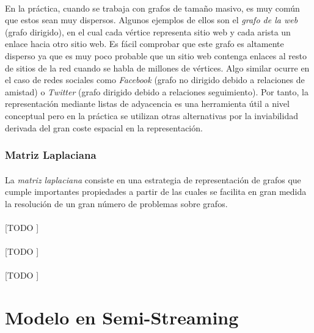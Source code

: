 \documentclass{subfiles}
\begin{document}
        \paragraph{}
        En la práctica, cuando se trabaja con grafos de tamaño masivo, es muy común que estos sean muy dispersos. Algunos ejemplos de ellos son el \emph{grafo de la web} (grafo dirigido), en el cual cada vértice representa sitio web y cada arista un enlace hacia otro sitio web. Es fácil comprobar que este grafo es altamente disperso ya que es muy poco probable que un sitio web contenga enlaces al resto de sitios de la red cuando se habla de millones de vértices. Algo similar ocurre en el caso de redes sociales como \emph{Facebook} (grafo no dirigido debido a relaciones de amistad) o \emph{Twitter} (grafo dirigido debido a relaciones seguimiento). Por tanto, la representación mediante listas de adyacencia es una herramienta útil a nivel conceptual pero en la práctica se utilizan otras alternativas por la inviabilidad derivada del gran coste espacial en la representación.


        \subsubsection{Matriz Laplaciana}
        \label{sec:laplacian_matrix}

          \paragraph{}
          La \emph{matriz laplaciana} consiste en una estrategia de representación de grafos que cumple importantes propiedades a partir de las cuales se facilita en gran medida la resolución de un gran número de problemas sobre grafos.

          \paragraph{}
          [TODO ]

          \paragraph{}
          [TODO ]

          \paragraph{}
          [TODO ]

    \section{Modelo en Semi-Streaming}
    \label{sec:semi_streaming_model}
\end{document}
